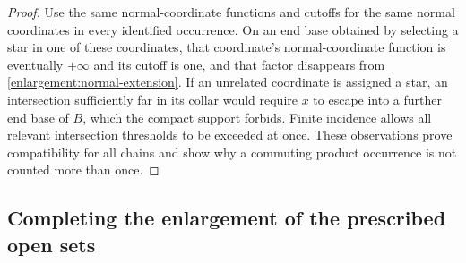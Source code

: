 \begin{proof}
Use the same normal-coordinate functions and cutoffs for the same normal coordinates in every
identified occurrence.  On an end base obtained by selecting a star in one of these
coordinates, that coordinate's normal-coordinate function is eventually $+\infty$ and its
cutoff is one, and that factor disappears from
\cref{enlargement:normal-extension}.  If an unrelated coordinate is assigned a star, an
intersection sufficiently far in its collar would require $x$ to
escape into a further end base of $B$, which the compact support forbids.
Finite incidence allows all relevant intersection thresholds to be
exceeded at once.  These observations prove compatibility for all
chains and show why a commuting product occurrence is not counted
more than once.
\end{proof}

\subsection{Completing the enlargement of the prescribed open sets}

